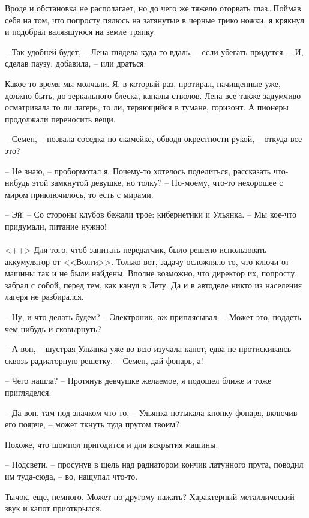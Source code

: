 \documentclass[a4paper]{book}
\begin{document}
Вроде и обстановка не располагает, но до чего же тяжело оторвать глаз\ldots Поймав себя на том, что попросту пялюсь на затянутые в черные трико ножки, я крякнул и подобрал валявшуюся на земле тряпку. 

-- Так удобней будет, -- Лена глядела куда-то вдаль, -- если убегать придется. -- И, сделав паузу, добавила, -- или драться.

Какое-то время мы молчали. Я, в который раз, протирал, начищенные уже, должно быть, до зеркального блеска, каналы стволов. Лена все также задумчиво осматривала то ли лагерь, то ли, теряющийся в тумане, горизонт. А пионеры продолжали переносить вещи. 

-- Семен, -- позвала соседка по скамейке, обводя окрестности рукой, -- откуда все это?

-- Не знаю, -- пробормотал я. Почему-то хотелось поделиться, рассказать что-нибудь этой замкнутой девушке, но толку? -- По-моему, что-то нехорошее с миром приключилось, то есть с мирами.

-- Эй! -- Со стороны клубов бежали трое: кибернетики и Ульянка. -- Мы кое-что придумали, питание нужно!

\paragraph{}<++>
Для того, чтоб запитать передатчик, было решено использовать аккумулятор от <<Волги>>. Только вот, задачу осложняло то, что ключи от машины так и не были найдены. Вполне возможно, что директор их, попросту, забрал с собой, перед тем, как канул в Лету. Да и в автоделе никто из населения лагеря не разбирался.

-- Ну, и что делать будем? -- Электроник, аж приплясывал. -- Может это, поддеть чем-нибудь и сковырнуть? 

-- А вон, -- шустрая Ульянка уже во всю изучала капот, едва не протискиваясь сквозь радиаторную решетку. -- Семен, дай фонарь, а!

-- Чего нашла? -- Протянув девчушке желаемое, я подошел ближе и тоже пригляделся. 

-- Да вон, там под значком что-то, -- Ульянка потыкала кнопку фонаря, включив его поярче, --  может ткнуть туда прутом твоим?

Похоже, что шомпол пригодится и для вскрытия машины.

-- Подсвети, -- просунув в щель над радиатором кончик латунного прута, поводил им туда-сюда,  -- во, нащупал что-то. 

Тычок, еще, немного. Может по-другому нажать? Характерный металлический звук и капот приоткрылся. 
\end{document}
